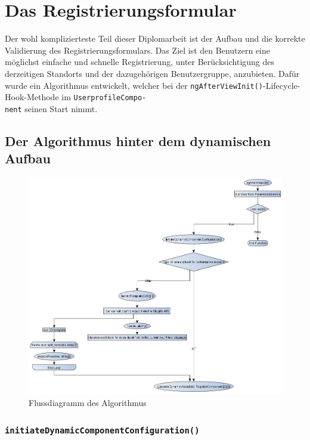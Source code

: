 \chapter{Das Registrierungsformular}

Der wohl komplizierteste Teil dieser Diplomarbeit ist der Aufbau und die korrekte Validierung des Registrierungsformulars. Das Ziel ist den Benutzern eine möglichst einfache und schnelle Registrierung, unter Berücksichtigung des derzeitigen Standorts und der dazugehörigen Benutzergruppe, anzubieten. Dafür wurde ein Algorithmus entwickelt, welcher bei der \texttt{ngAfterViewInit()}-Lifecycle-Hook-Methode im \texttt{UserprofileCompo-\\nent} seinen Start nimmt.

\section{Der Algorithmus hinter dem dynamischen Aufbau}

\begin{figure}[H]
	\centerline{
		\includegraphics[width=1\textwidth, frame]{./grafiken/RF_Flussdiagramm.png}
	}
	\vskip0pt
	\caption{Flussdiagramm des Algorithmus}
	\label{fig:fc}
\end{figure}

\subsection{\texttt{initiateDynamicComponentConfiguration()}} \label{ssec:lblInitDCC}

